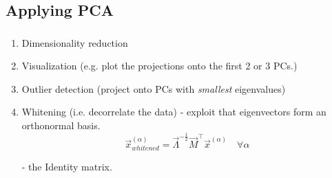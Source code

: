 \subsection{Applying PCA}



\begin{frame}\frametitle{\subsecname}

\begin{enumerate}
\item Dimensionality reduction
\item Visualization (e.g. plot the projections onto the first 2 or 3 PCs.)
\item Outlier detection (project onto PCs with \emph{smallest} eigenvalues)
\item Whitening (i.e. decorrelate the data) - exploit that eigenvectors form an orthonormal basis.
\begin{equation}
\vec x_{whitened}^{(\alpha)} = \vec{\Lambda}^{-\frac{1}{2}}\vec{M}^\top\vec{x}^{(\alpha)}
\quad
\forall \alpha
\end{equation}


\pause

- the Identity matrix.

\end{enumerate}

\end{frame}

